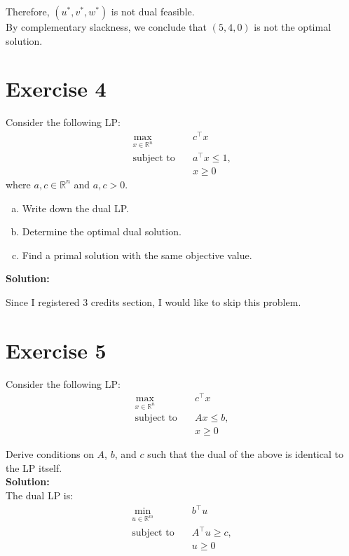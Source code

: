 \documentclass{article}
\begin{document}
Therefore, $(u^*, v^*, w^*)$ is not dual feasible. \\

By complementary slackness, we conclude that $(5,4,0)$ is not the optimal solution.

\newpage

\section*{Exercise 4}
Consider the following LP:
\begin{align*}
\max_{x \in \mathbb{R}^n} \quad & c^{\top} x \\
\text{subject to} \quad & a^{\top} x \leq 1, \\
& x \geq 0
\end{align*}
where $a, c \in \mathbb{R}^n$ and $a, c > 0$.

\begin{enumerate}[(a)]
    \item Write down the dual LP.
    \item Determine the optimal dual solution.
    \item Find a primal solution with the same objective value.
\end{enumerate}

\textbf{Solution:}

Since I registered 3 credits section, I would like to skip this problem.

\newpage

\section*{Exercise 5}
Consider the following LP:
\begin{align*}
\max_{x \in \mathbb{R}^n} \quad & c^{\top} x \\
\text{subject to} \quad & Ax \leq b, \\
& x \geq 0
\end{align*}

Derive conditions on $A$, $b$, and $c$ such that the dual of the above is identical to the LP itself. \\

\textbf{Solution:} \\

The dual LP is:
\begin{align*}
\min_{u \in \mathbb{R}^m} \quad & b^{\top} u \\
\text{subject to} \quad & A^{\top} u \geq c, \\
& u \geq 0
\end{align*}
\end{document}
